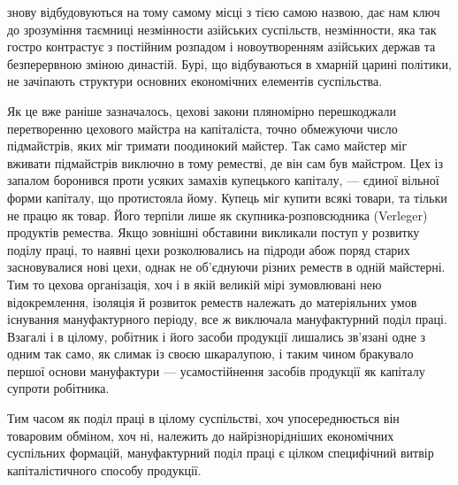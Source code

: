 \parcont{}  %
знову відбудовуються на тому самому місці з тією самою назвою,
дає нам ключ до зрозуміння таємниці незмінности азійських
суспільств, незмінности, яка так гостро контрастує з постійним
розпадом і новоутворенням азійських держав та безперервною
зміною династій. Бурі, що відбуваються в хмарній царині політики,
не зачіпають структури основних економічних елементів
суспільства.

Як це вже раніше зазначалось, цехові закони пляномірно
перешкоджали перетворенню цехового майстра на капіталіста,
точно обмежуючи число підмайстрів, яких міг тримати поодинокий
майстер. Так само майстер міг вживати підмайстрів виключно
в тому реместві, де він сам був майстром. Цех із запалом
боронився проти усяких замахів купецького капіталу, —
єдиної вільної форми капіталу, що протистояла йому. Купець
міг купити всякі товари, та тільки не працю як товар. Його терпіли
лише як скупника-розповсюдника (Verleger) продуктів
ремества. Якщо зовнішні обставини викликали поступ у розвитку
поділу праці, то наявні цехи розколювались на підроди абож
поряд старих засновувалися нові цехи, однак не об’єднуючи різних
реместв в одній майстерні. Тим то цехова організація, хоч і в
якій великій мірі зумовлювані нею відокремлення, ізоляція й
розвиток реместв належать до матеріяльних умов існування
мануфактурного періоду, все ж виключала мануфактурний поділ
праці. Взагалі і в цілому, робітник і його засоби продукції
лишались зв’язані одне з одним так само, як слимак із своєю
шкаралупою, і таким чином бракувало першої основи мануфактури
— усамостійнення засобів продукції як капіталу супроти
робітника.

Тим часом як поділ праці в цілому суспільстві, хоч упосереднюється
він товаровим обміном, хоч ні, належить до найрізнорідніших
економічних суспільних формацій, мануфактурний
поділ праці є цілком специфічний витвір капіталістичного способу
продукції.
